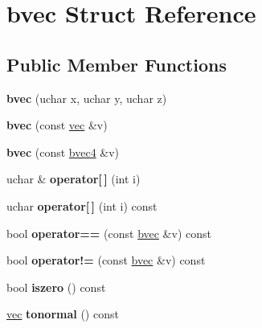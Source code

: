 \hypertarget{structbvec}{}\section{bvec Struct Reference}
\label{structbvec}
\subsection*{Public Member Functions}
\begin{DoxyCompactItemize}
\item 
\mbox{\label{structbvec_af652c6946e4460607b5ed202f57b71f9}} 
{\bfseries bvec} (uchar x, uchar y, uchar z)
\item 
\mbox{\label{structbvec_a52bc26cf26698899db453e2cef0a97e3}} 
{\bfseries bvec} (const \hyperlink{structvec}{vec} \&v)
\item 
\mbox{\label{structbvec_a43fe1610e4a6536b020649de723e3d52}} 
{\bfseries bvec} (const \hyperlink{structbvec4}{bvec4} \&v)
\item 
\mbox{\label{structbvec_a1e9cc3a4d332880e47663dd53af3c50b}} 
uchar \& {\bfseries operator\mbox{[}$\,$\mbox{]}} (int i)
\item 
\mbox{\label{structbvec_a037d3da0d01a096e8d610fc5345b34b1}} 
uchar {\bfseries operator\mbox{[}$\,$\mbox{]}} (int i) const
\item 
\mbox{\label{structbvec_af6ef4f9d1b42fa1752d5772ce1935d48}} 
bool {\bfseries operator==} (const \hyperlink{structbvec}{bvec} \&v) const
\item 
\mbox{\label{structbvec_a4f178f7b4909b31d6e9f55bc65e4bb32}} 
bool {\bfseries operator!=} (const \hyperlink{structbvec}{bvec} \&v) const
\item 
\mbox{\label{structbvec_ab998960d3be480a7c8ce7aa0787ca202}} 
bool {\bfseries iszero} () const
\item 
\mbox{\label{structbvec_a4a50db200b0415ae0a9f5a1897bf5b7b}} 
\hyperlink{structvec}{vec} {\bfseries tonormal} () const
\item 
\mbox{\label{structbvec_a3a66f45d31eb0c97f11626b336fed8d0}} 

\end{DoxyCompactItemize}
